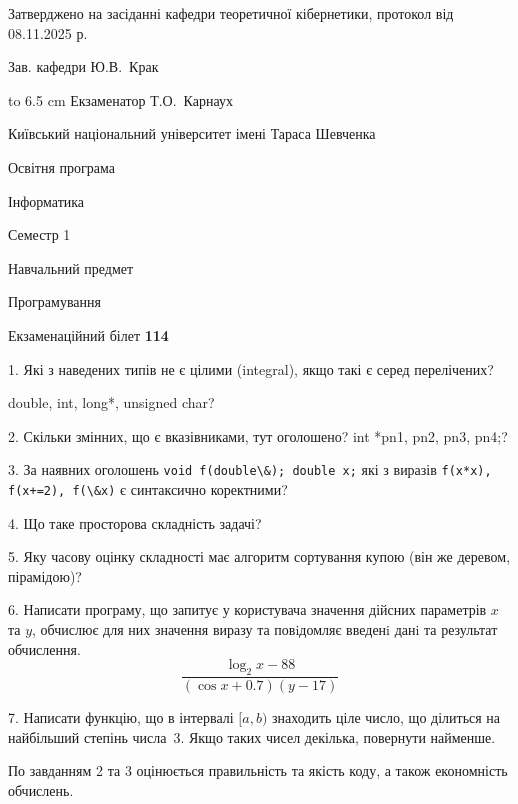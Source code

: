 \documentclass[12pt, ukrainian]{article}
\def\code#1{\Verb!#1!}
\begin{document}
{\smallskip\smallskip \begin {scriptsize} Затверджено на засіданні кафедри теоретичної кібернетики, протокол   від   08.11.2025 р.\par\smallskip\smallskip\smallskip\smallskip
{\parbox {6.5 cm} {Зав. кафедри \dotfill Ю.В.~Крак}}\hspace {0.7cm} {\hbox to 6.5 cm { Екзаменатор \dotfill Т.О.~Карнаух}} \end{scriptsize}}
\vspace{0.9cm}
{{\begin {scriptsize}\par
{ \center  Київський національний університет імені Тараса Шевченка \par}
{\parbox {5 cm}{Освітня програма \hfill}{\parbox {7 cm}{Інформатика\hfill}}\parbox {6 cm}{\hfill Семестр 1}}\par
{\parbox {5 cm} {Навчальний предмет \hfill}\parbox {7 cm}{Програмування \hfill}\parbox {6cm}{\hfill}\par}\vspace{-15pt} \end{scriptsize}}{\center Екзаменаційний білет \No \textbf { 114 }\par}}
{%
1. Які з наведених типів не є цілими (integral), якщо такі є серед перелічених?

double, int, long*, unsigned char?
\par
\vspace{2mm}
2. Скільки змінних, що є вказівниками, тут оголошено?
int *pn1, pn2, pn3, pn4;?
\par
\vspace{2mm}
3. За наявних оголошень \code{void f(double\&); double x;} які з виразів \code{f(x*x), f(x+=2), f(\&x)} є синтаксично коректними?
\par
\vspace{2mm}
4. Що таке просторова складність задачі?
\par
\vspace{2mm}
5. Яку часову оцінку складності має алгоритм сортування купою (він же деревом, пірамідою)?
\par
\vspace{2mm}
6. Написати програму, що запитує у користувача значення дійсних параметрів $x$ та $y$, обчислює для них значення виразу та повiдомляє введенi данi та результат обчислення.
$$\frac{\log_{2} x - 88}{(\cos x + 0.7) (y - 17)}$$ 

\par
7. Написати функцію, що в інтервалі $[a, b)$ знаходить ціле число, що ділиться на найбільший степінь числа 3. Якщо таких чисел декілька, повернути найменше.

По завданням 2 та 3 оцінюється правильність та якість коду, а також економність обчислень.

}
\end{document}
